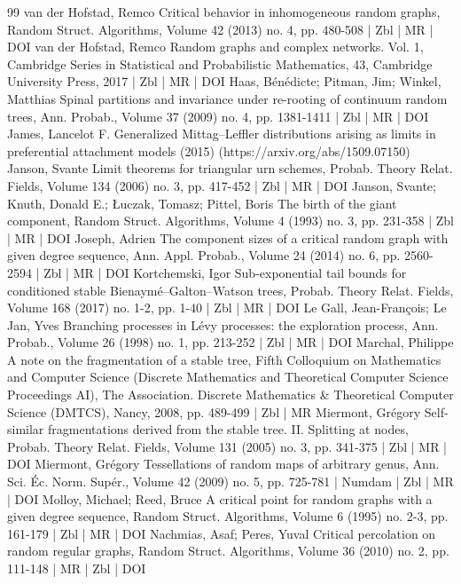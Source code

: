 \begin{thebibliography}{99}
van der Hofstad, Remco Critical behavior in inhomogeneous random graphs, Random Struct. Algorithms, Volume 42 (2013) no. 4, pp. 480-508 | Zbl | MR | DOI
van der Hofstad, Remco Random graphs and complex networks. Vol. 1, Cambridge Series in Statistical and Probabilistic Mathematics, 43, Cambridge University Press, 2017 | Zbl | MR | DOI
Haas, Bénédicte; Pitman, Jim; Winkel, Matthias Spinal partitions and invariance under re-rooting of continuum random trees, Ann. Probab., Volume 37 (2009) no. 4, pp. 1381-1411 | Zbl | MR | DOI
James, Lancelot F. Generalized Mittag–Leffler distributions arising as limits in preferential attachment models (2015) (https://arxiv.org/abs/1509.07150)
Janson, Svante Limit theorems for triangular urn schemes, Probab. Theory Relat. Fields, Volume 134 (2006) no. 3, pp. 417-452 | Zbl | MR | DOI
Janson, Svante; Knuth, Donald E.; Łuczak, Tomasz; Pittel, Boris The birth of the giant component, Random Struct. Algorithms, Volume 4 (1993) no. 3, pp. 231-358 | Zbl | MR | DOI
Joseph, Adrien The component sizes of a critical random graph with given degree sequence, Ann. Appl. Probab., Volume 24 (2014) no. 6, pp. 2560-2594 | Zbl | MR | DOI
Kortchemski, Igor Sub-exponential tail bounds for conditioned stable Bienaymé–Galton–Watson trees, Probab. Theory Relat. Fields, Volume 168 (2017) no. 1-2, pp. 1-40 | Zbl | MR | DOI
Le Gall, Jean-François; Le Jan, Yves Branching processes in Lévy processes: the exploration process, Ann. Probab., Volume 26 (1998) no. 1, pp. 213-252 | Zbl | MR | DOI
Marchal, Philippe A note on the fragmentation of a stable tree, Fifth Colloquium on Mathematics and Computer Science (Discrete Mathematics and Theoretical Computer Science Proceedings AI), The Association. Discrete Mathematics \& Theoretical Computer Science (DMTCS), Nancy, 2008, pp. 489-499 | Zbl | MR
Miermont, Grégory Self-similar fragmentations derived from the stable tree. II. Splitting at nodes, Probab. Theory Relat. Fields, Volume 131 (2005) no. 3, pp. 341-375 | Zbl | MR | DOI
Miermont, Grégory Tessellations of random maps of arbitrary genus, Ann. Sci. Éc. Norm. Supér., Volume 42 (2009) no. 5, pp. 725-781 | Numdam | Zbl | MR | DOI
Molloy, Michael; Reed, Bruce A critical point for random graphs with a given degree sequence, Random Struct. Algorithms, Volume 6 (1995) no. 2-3, pp. 161-179 | Zbl | MR | DOI
Nachmias, Asaf; Peres, Yuval Critical percolation on random regular graphs, Random Struct. Algorithms, Volume 36 (2010) no. 2, pp. 111-148 | MR | Zbl | DOI

\end{thebibliography}
